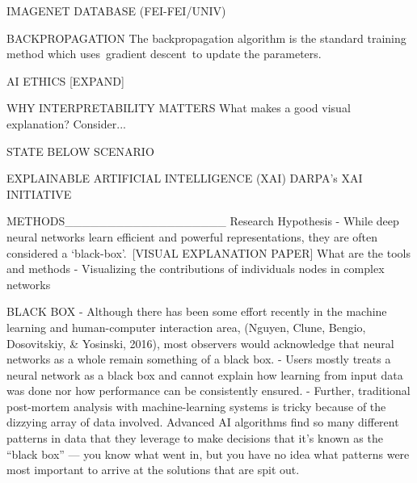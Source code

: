 IMAGENET DATABASE (FEI-FEI/UNIV)

BACKPROPAGATION
The backpropagation algorithm is the standard training method which uses gradient descent to update the parameters.

AI ETHICS [EXPAND]

WHY INTERPRETABILITY MATTERS
What makes a good visual explanation? Consider...

STATE BELOW SCENARIO
\iffalse
The 2017 report from the AI committee of the British parliament states that the development of the intelligence AI systems is a fundamental necessity if an AI system is to become an integral and trusted tool in the society. Whether it takes the shape of explainability, technological transparency or both depend on the context and stakes involved in its application. However, in most cases, the report ascertains, explainability to be a useful approach for the citizens and the consumers. Further, the report suggests that it is not acceptable to implement an artificial intelligence system that could have a substantial impact on an individual's life unless it can provide a full, comprehensive and satisfactory explanation for the decisions it makes. It means delaying their deployment for such use cases until a credible alternative solution is found.
\fi

EXPLAINABLE ARTIFICIAL INTELLIGENCE (XAI)
DARPA's XAI INITIATIVE




METHODS___________________
Research Hypothesis
- While deep neural networks learn efficient and powerful representations, they are often considered a ‘black-box’. [VISUAL EXPLANATION PAPER] What are the tools and methods 
- Visualizing the contributions of individuals nodes in complex networks

BLACK BOX
- Although there has been some effort recently in the machine learning and human-computer interaction area, (Nguyen, Clune, Bengio, Dosovitskiy, & Yosinski, 2016), most observers would acknowledge that neural networks as a whole remain something of a black box.
- Users mostly treats a neural network as a black box and cannot explain how learning from input data was done nor how performance can be consistently ensured.
- Further, traditional post-mortem analysis with machine-learning systems is tricky because of the dizzying array of data involved. Advanced AI algorithms find so many different patterns in data that they leverage to make decisions that it’s known as the “black box” — you know what went in, but you have no idea what patterns were most important to arrive at the solutions that are spit out.

